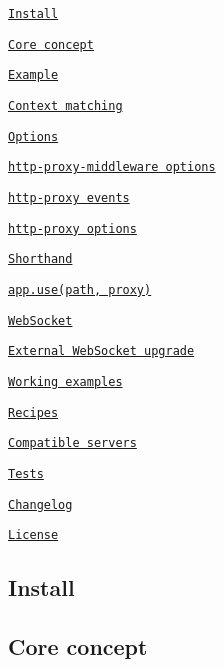 \begin{DoxyItemize}
\item \href{#install}{\tt Install}
\item \href{#core-concept}{\tt Core concept}
\item \href{#example}{\tt Example}
\item \href{#context-matching}{\tt Context matching}
\item \href{#options}{\tt Options}
\begin{DoxyItemize}
\item \href{#http-proxy-middleware-options}{\tt http-\/proxy-\/middleware options}
\item \href{#http-proxy-events}{\tt http-\/proxy events}
\item \href{#http-proxy-options}{\tt http-\/proxy options}
\end{DoxyItemize}
\item \href{#shorthand}{\tt Shorthand}
\begin{DoxyItemize}
\item \href{#appusepath-proxy}{\tt app.\+use(path, proxy)}
\end{DoxyItemize}
\item \href{#websocket}{\tt Web\+Socket}
\begin{DoxyItemize}
\item \href{#external-websocket-upgrade}{\tt External Web\+Socket upgrade}
\end{DoxyItemize}
\item \href{#working-examples}{\tt Working examples}
\item \href{#recipes}{\tt Recipes}
\item \href{#compatible-servers}{\tt Compatible servers}
\item \href{#tests}{\tt Tests}
\item \href{#changelog}{\tt Changelog}
\item \href{#license}{\tt License}
\end{DoxyItemize}

\subsection*{Install}




\subsection*{Core concept}

